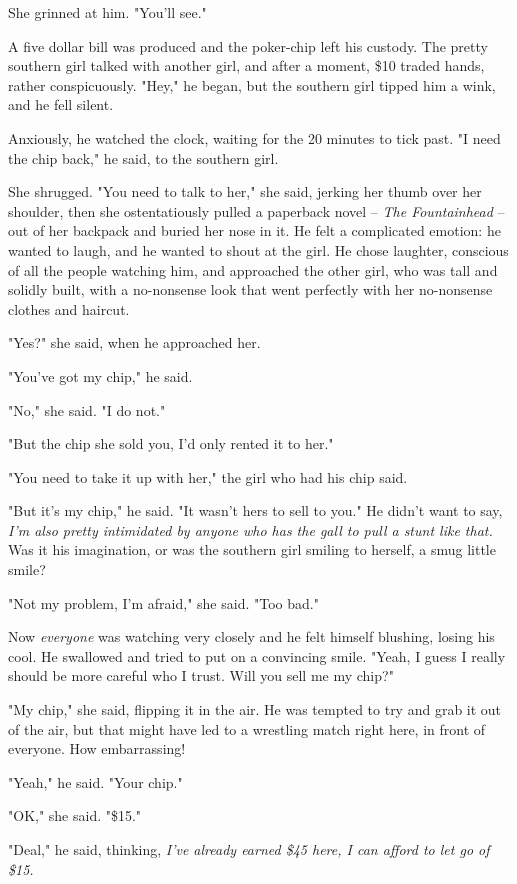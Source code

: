 She grinned at him. "You'll see."

A five dollar bill was produced and the poker-chip left his
custody. The pretty southern girl talked with another girl, and
after a moment, \$10 traded hands, rather conspicuously. "Hey," he
began, but the southern girl tipped him a wink, and he fell
silent.

Anxiously, he watched the clock, waiting for the 20 minutes to tick
past. "I need the chip back," he said, to the southern girl.

She shrugged. "You need to talk to her," she said, jerking her
thumb over her shoulder, then she ostentatiously pulled a paperback
novel -- \emph{The Fountainhead} -- out of her backpack and buried
her nose in it. He felt a complicated emotion: he wanted to laugh,
and he wanted to shout at the girl. He chose laughter, conscious of
all the people watching him, and approached the other girl, who was
tall and solidly built, with a no-nonsense look that went perfectly
with her no-nonsense clothes and haircut.

"Yes?" she said, when he approached her.

"You've got my chip," he said.

"No," she said. "I do not."

"But the chip she sold you, I'd only rented it to her."

"You need to take it up with her," the girl who had his chip said.

"But it's my chip," he said. "It wasn't hers to sell to you." He
didn't want to say,
\emph{I'm also pretty intimidated by anyone who has the gall to pull a stunt like that.}
Was it his imagination, or was the southern girl smiling to
herself, a smug little smile?

"Not my problem, I'm afraid," she said. "Too bad."

Now \emph{everyone} was watching very closely and he felt himself
blushing, losing his cool. He swallowed and tried to put on a
convincing smile. "Yeah, I guess I really should be more careful
who I trust. Will you sell me my chip?"

"My chip," she said, flipping it in the air. He was tempted to try
and grab it out of the air, but that might have led to a wrestling
match right here, in front of everyone. How embarrassing!

"Yeah," he said. "Your chip."

"OK," she said. "\$15."

"Deal," he said, thinking,
\emph{I've already earned \$45 here, I can afford to let go of \$15.}

